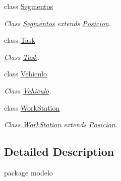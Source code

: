 \begin{DoxyCompactItemize}
class \mbox{\hyperlink{classmodelo_1_1_segmentos}{Segmentos}}
\begin{DoxyCompactList}\small\item\em Class \mbox{\hyperlink{classmodelo_1_1_segmentos}{Segmentos}} extends \mbox{\hyperlink{classmodelo_1_1_posicion}{Posicion}}. \end{DoxyCompactList}\item 
class \mbox{\hyperlink{classmodelo_1_1_task}{Task}}
\begin{DoxyCompactList}\small\item\em Class \mbox{\hyperlink{classmodelo_1_1_task}{Task}}. \end{DoxyCompactList}\item 
class \mbox{\hyperlink{classmodelo_1_1_vehiculo}{Vehiculo}}
\begin{DoxyCompactList}\small\item\em Class \mbox{\hyperlink{classmodelo_1_1_vehiculo}{Vehiculo}}. \end{DoxyCompactList}\item 
class \mbox{\hyperlink{classmodelo_1_1_work_station}{Work\+Station}}
\begin{DoxyCompactList}\small\item\em Class \mbox{\hyperlink{classmodelo_1_1_work_station}{Work\+Station}} extends \mbox{\hyperlink{classmodelo_1_1_posicion}{Posicion}}. \end{DoxyCompactList}\end{DoxyCompactItemize}


\subsection{Detailed Description}
package modelo 